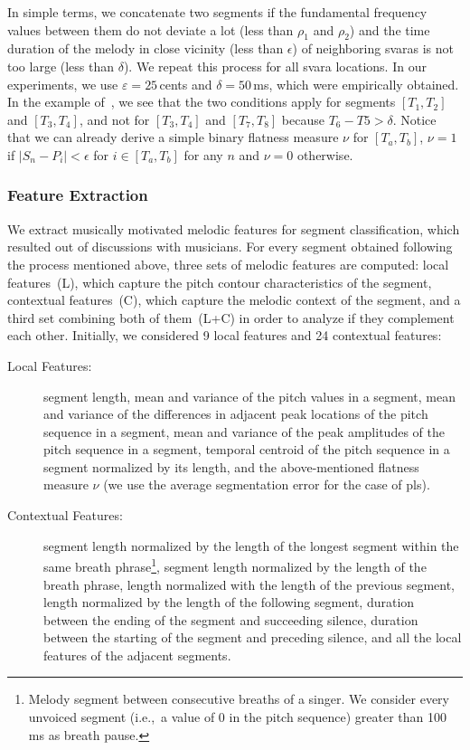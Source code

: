 {In simple terms, we concatenate two segments if the fundamental frequency values between them do not deviate a lot (less than $\rho_1$ and $\rho_2$) and the time duration of the melody in close vicinity (less than $\epsilon$) of neighboring \glspl{svara} is not too large (less than $\delta$). We repeat this process for all \gls{svara} locations. In our experiments, we use $\varepsilon = 25$\,cents and $\delta=50$\,ms, which were empirically obtained. In the example of~, we see that the two conditions apply for segments $[T_1,T_2]$ and $[T_3,T_4]$, and not for $[T_3,T_4]$ and $[T_7,T_8]$ because $T_6-T5>\delta$. Notice that we can already derive a simple binary flatness measure $\nu$ for $[T_a, T_b]$, $\nu=1$ if $\vert S_n-P_i \vert< \epsilon$ for $i \in [T_a, T_b]$ for any $n$ and $\nu=0$ otherwise. 

\subsubsection{Feature Extraction}
\label{sec:pro_processing_nyas_segmentation_feature_extraction}

We extract musically motivated melodic features for segment classification, which resulted out of discussions with musicians. For every segment obtained following the process mentioned above, three sets of melodic features are computed: local features~(L), which capture the pitch contour characteristics of the segment, contextual features~(C), which capture the melodic context of the segment, and a third set combining both of them~(L+C) in order to analyze if they complement each other. Initially, we considered 9 local features and 24 contextual features:

\begin{description}
	\item[Local Features:] segment length, mean and variance of the pitch values in a segment, mean and variance of the differences in adjacent peak locations of the pitch sequence in a segment, mean and variance of the  peak amplitudes of the pitch sequence in a segment, temporal centroid of the pitch sequence in a segment normalized by its length, and the above-mentioned flatness measure $\nu$ (we use the average segmentation error for the case of \gls{pls}).
	\item[Contextual Features:] segment length normalized by the length of the longest segment within the same breath phrase\footnote{Melody segment between consecutive breaths of a singer. We consider every unvoiced segment (i.e.,~a value of 0 in the pitch sequence) greater than 100\,ms as breath pause.}, segment length normalized by the length of the breath phrase, length normalized with the length of the previous segment, length normalized by the length of the following segment, duration between the ending of the segment and succeeding silence, duration between the starting of the segment and preceding silence, and all the local features of the adjacent segments.
\end{description}

}
